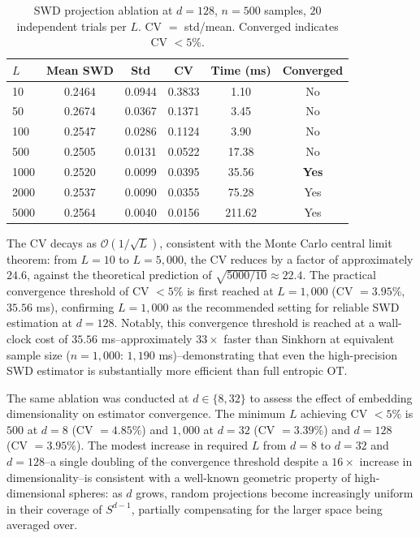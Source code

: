 \documentclass{article}
\begin{document}
	\begin{table}[h]
		\centering
		\caption{SWD projection ablation at $d = 128$, $n = 500$ samples, $20$ independent trials per $L$. CV $=$ std/mean. Converged indicates CV $< 5\%$.}
		\label{tab:ablation}
		\begin{tabular}{lccccc}
			\toprule
			$L$ & \textbf{Mean SWD} & \textbf{Std} & \textbf{CV} & 
			\textbf{Time (ms)} & \textbf{Converged} \\
			\midrule
			10    & 0.2464 & 0.0944 & 0.3833 & 1.10 & No  \\
			50    & 0.2674 & 0.0367 & 0.1371 & 3.45 & No  \\
			100   & 0.2547 & 0.0286 & 0.1124 & 3.90 & No  \\
			500   & 0.2505 & 0.0131 & 0.0522 & 17.38 & No  \\
			1000  & 0.2520 & 0.0099 & 0.0395 & 35.56 & \textbf{Yes} \\
			2000  & 0.2537 & 0.0090 & 0.0355 & 75.28 & Yes \\
			5000  & 0.2564 & 0.0040 & 0.0156 & 211.62 & Yes \\
			\bottomrule
		\end{tabular}
	\end{table}
	
	The CV decays as $\mathcal{O}(1/\sqrt{L})$, consistent with the Monte Carlo central limit theorem: from $L = 10$ to $L = 5{,}000$, the CV reduces by a factor of approximately $24.6$, against the theoretical prediction of $\sqrt{5000/10} \approx 22.4$. The practical convergence threshold of CV $< 5\%$ is first reached at $L = 1{,}000$ (CV $= 3.95\%$, $35.56$ ms), confirming $L = 1{,}000$ as the recommended setting for reliable SWD estimation at $d = 128$. Notably, this convergence threshold is reached at a wall-clock cost of $35.56$ ms--approximately $33\times$ faster than Sinkhorn at equivalent sample size ($n = 1{,}000$: $1{,}190$ ms)--demonstrating that even the high-precision SWD estimator is substantially more efficient than full entropic OT.
	
	The same ablation was conducted at $d \in \{8, 32\}$ to assess the effect of embedding dimensionality on estimator convergence. The minimum $L$ achieving CV $< 5\%$ is $500$ at $d = 8$ (CV $= 4.85\%$) and $1{,}000$ at $d = 32$ (CV $= 3.39\%$) and $d = 128$ (CV $= 3.95\%$). The modest increase in required $L$ from $d = 8$ to $d = 32$ and $d = 128$--a single doubling of the convergence threshold despite a $16\times$ increase in dimensionality--is consistent with a well-known geometric property of high-dimensional spheres: as $d$ grows, random projections become increasingly uniform in their coverage of $S^{d-1}$, partially compensating for the larger space being averaged over.
	
\end{document}
